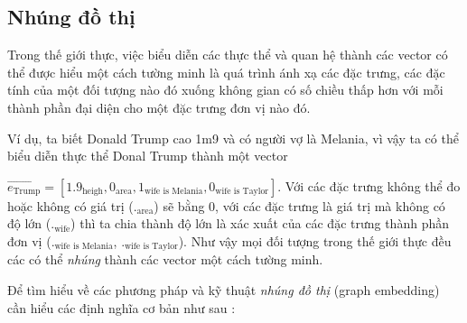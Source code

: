 \subsection{Nhúng đồ thị}
\label{sec:graphEmbedding}

Trong thế giới thực, việc biểu diễn các thực thể và quan hệ thành các vector có thể được hiểu một cách tường minh là quá trình ánh xạ các đặc trưng, các đặc tính của một đối tượng nào đó xuống không gian có số chiều thấp hơn với mỗi thành phần đại diện cho một đặc trưng đơn vị nào đó. 

Ví dụ, ta biết Donald Trump cao 1m9 và có người vợ là Melania, vì vậy ta có thể biểu diễn thực thể Donal Trump thành một vector

$\overrightarrow{e_\text{Trump}} = [1.9_{\text{heigh}}, 0_{\text{area}}, 1_\text{wife is Melania}, 0_\text{wife is Taylor}]$. Với các đặc trưng không thể đo hoặc không có giá trị ($._{\text{area}}$) sẽ bằng 0, với các đặc trưng là giá trị mà không có độ lớn ($._{\text{wife}}$) thì ta chia thành độ lớn là xác xuất của các đặc trưng thành phần đơn vị ($._{\text{wife is Melania}}$, $._{\text{wife is Taylor}}$). Như vậy mọi đối tượng trong thế giới thực đều các có thể \textit{nhúng} thành các vector một cách tường minh.

Để tìm hiểu về các phương pháp và kỹ thuật \textit{nhúng đồ thị} (graph embedding) cần hiểu các định nghĩa cơ bản như sau : 	

